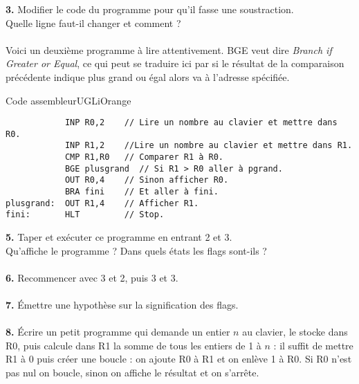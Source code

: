 \documentclass[a4paper,10pt,french]{article}
\begin{document}
\textbf{3.} Modifier le code du programme pour qu'il fasse une soustraction.\\
Quelle ligne faut-il changer et comment ?\\

\\

Voici un deuxième programme à lire attentivement. BGE veut dire \og \textit{Branch if Greater or Equal}\fg{}, ce qui peut se traduire ici par \og si le résultat de la comparaison précédente indique  plus grand ou égal alors va à l'adresse spécifiée\fg{}.

\begin{encadrecolore}{Code assembleur}{UGLiOrange}
\begin{verbatim}
            INP R0,2    // Lire un nombre au clavier et mettre dans R0.
            INP R1,2    //Lire un nombre au clavier et mettre dans R1.
            CMP R1,R0   // Comparer R1 à R0.
            BGE plusgrand  // Si R1 > R0 aller à pgrand.
            OUT R0,4    // Sinon afficher R0.
            BRA fini    // Et aller à fini.
plusgrand:  OUT R1,4    // Afficher R1.
fini:       HLT         // Stop.
\end{verbatim}
\end{encadrecolore}


\textbf{5.} Taper et exécuter ce programme en entrant 2 et 3.\\
Qu'affiche le programme ? Dans quels états les flags sont-ils ?\\

\\

\textbf{6.} Recommencer avec 3 et 2, puis 3 et 3.\\

\\

\textbf{7.} \'Emettre une hypothèse sur la signification des flags.\\

\\

\textbf{8.} \'Ecrire un petit programme qui demande un entier $n$ au clavier, le stocke dans R0, puis calcule dans R1 la
	somme de tous les entiers de 1 à $n$ : il suffit de mettre R1 à 0 puis créer une boucle : on ajoute R0 à R1 et on enlève 1 à R0. Si R0 n'est pas nul on boucle, sinon on affiche le résultat et on s'arrête.\\
\end{document}
